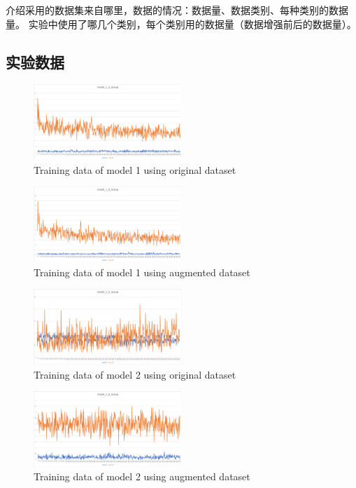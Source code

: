 \documentclass{ijisa}
\begin{document}
介绍采用的数据集来自哪里，数据的情况：数据量、数据类别、每种类别的数据量。
实验中使用了哪几个类别，每个类别用的数据量（数据增强前后的数据量）。

\subsection{实验数据}
\begin{figure}[h]
\includegraphics[width=0.5\textwidth]{charts/1A.png}
\caption{Training data of model 1 using original dataset}
\end{figure}


\begin{figure}[h]
\includegraphics[width=0.5\textwidth]{charts/1B.png}
\caption{Training data of model 1 using augmented dataset}
\end{figure}

\begin{figure}[h]
\includegraphics[width=0.5\textwidth]{charts/2A.png}
\caption{Training data of model 2 using original dataset}
\end{figure}


\begin{figure}[h]
\includegraphics[width=0.5\textwidth]{charts/2B.png}
\caption{Training data of model 2 using augmented dataset}
\end{figure}
\end{document}

